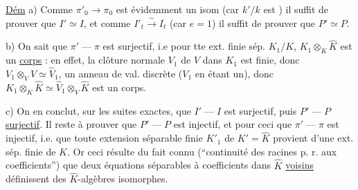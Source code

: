 
\uline{Dém} a) Comme $\pi'_0\longrightarrow\pi_0$ est évidemment un isom (car $k'/k$ est ) il suffit de prouver que $I'\simeq I$, et comme $I'_t\xrightarrow{\sim}I_t$ (car $e=1$) il suffit de prouver que $P'\simeq P$.

b) On sait que $\pi'\mathrel{\text{---}}\pi$ est surjectif, i.e pour tte ext. finie sép. $K_1/K$, $K_1\otimes_K\widehat K$ est un \uline{corps} : en effet, la clôture normale $V_1$ de $V$ dans $K_1$ est finie, donc $V_1\otimes_V\widehat V\simeq\widehat V_1$,   un anneau de val. discrète ($V_1$ en étant un), donc $K_1\otimes_K\widehat K\simeq\widehat V_1\otimes_V\widehat K$ est un corps.

 

c) On en conclut, sur les  suites exactes, que $I'\mathrel{\text{---}}I$ est surjectif, puis $P'\mathrel{\text{---}}P$ \uline{surjectif}.
Il reste à prouver que $P'\mathrel{\text{---}}P$ est injectif, et pour ceci que $\pi'\mathrel{\text{---}}\pi$ est injectif,  i.e. que toute extension séparable finie $K'_1$ de $K'=\widehat K$ provient d'une ext. sép. finie de $K$. Or ceci résulte du fait connu (``continuité des racines p. r. aux coefficients'') que deux équations séparables  à coefficients dans $\widehat K$ \uline{voisins} définissent des  $\widehat K$-algèbres isomorphes.
